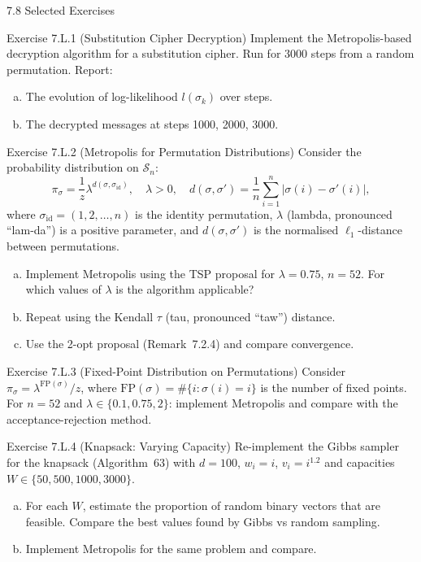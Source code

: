 \documentclass[aspectratio=169,10pt]{beamer}
\begin{document}
\begin{frame}[allowframebreaks]{7.8 Selected Exercises}

\begin{block}{Exercise 7.L.1 (Substitution Cipher Decryption)}
  Implement the Metropolis-based decryption algorithm for a substitution
  cipher.  Run for 3000 steps from a random permutation.  Report:
  \begin{enumerate}[(a)]
    \item The evolution of log-likelihood $l(\sigma_k)$ over steps.
    \item The decrypted messages at steps 1000, 2000, 3000.
  \end{enumerate}
\end{block}

\begin{block}{Exercise 7.L.2 (Metropolis for Permutation Distributions)}
  Consider the probability distribution on $\mathcal{S}_n$:
  \[
    \pi_\sigma = \frac{1}{z}\lambda^{d(\sigma,\sigma_{\mathrm{id}})},
    \quad \lambda > 0,
    \quad d(\sigma,\sigma') = \frac{1}{n}\sum_{i=1}^n |\sigma(i)-\sigma'(i)|,
  \]
  where $\sigma_{\mathrm{id}} = (1,2,\ldots,n)$ is the identity permutation,
  $\lambda$ (lambda, pronounced ``lam-da'') is a positive parameter, and
  $d(\sigma,\sigma')$ is the normalised $\ell_1$-distance between
  permutations.
  \begin{enumerate}[(a)]
    \item Implement Metropolis using the TSP proposal for $\lambda = 0.75$,
      $n = 52$.  For which values of $\lambda$ is the algorithm applicable?
    \item Repeat using the Kendall $\tau$ (tau, pronounced ``taw'') distance.
    \item Use the 2-opt proposal (Remark~7.2.4) and compare convergence.
  \end{enumerate}
\end{block}

\framebreak

\begin{block}{Exercise 7.L.3 (Fixed-Point Distribution on Permutations)}
  Consider $\pi_\sigma = \lambda^{\mathrm{FP}(\sigma)} / z$, where
  $\mathrm{FP}(\sigma) = \#\{i : \sigma(i) = i\}$ is the number of fixed
  points.  For $n = 52$ and $\lambda \in \{0.1, 0.75, 2\}$: implement
  Metropolis and compare with the acceptance-rejection method.
\end{block}

\begin{block}{Exercise 7.L.4 (Knapsack: Varying Capacity)}
  Re-implement the Gibbs sampler for the knapsack (Algorithm~63) with
  $d=100$, $w_i=i$, $v_i=i^{1.2}$ and capacities $W \in \{50, 500, 1000, 3000\}$.
  \begin{enumerate}[(a)]
    \item For each $W$, estimate the proportion of random binary vectors
      that are feasible.  Compare the best values found by Gibbs vs random
      sampling.
    \item Implement Metropolis for the same problem and compare.
  \end{enumerate}
\end{block}


\end{frame}
\end{document}
